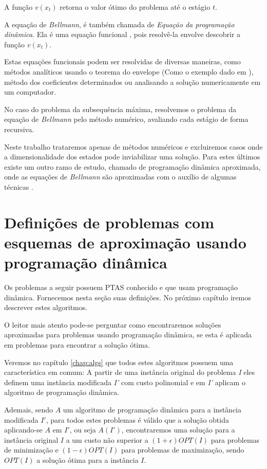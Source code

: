 A função $v(x_t)$ retorna o valor ótimo do problema até o estágio $t$.

A equação de \textit{Bellmann}, é também chamada de \textit{Equação da programação dinâmica}. Ela é uma equação funcional \cite{laibson}, pois resolvê-la envolve descobrir a função $v(x_t)$. 

Estas equações funcionais podem ser resolvidas de diversas maneiras, como métodos analíticos usando o teorema do envelope (Como o exemplo dado em \cite{laibson}), método dos coeficientes determinados ou analisando a solução numericamente em um computador.

No caso do problema da subsequência máxima, resolvemos o problema da equação de \textit{Bellmann} pelo método numérico, avaliando cada estágio de forma recursiva.

Neste trabalho trataremos apenas de métodos numéricos e excluiremos casos onde a dimensionalidade dos estados pode inviabilizar uma solução. Para estes últimos existe um outro ramo de estudo, chamado de programação dinâmica aproximada, onde as equações de \textit{Bellmann} são aproximadas com o auxílio de algumas técnicas \cite{Bertsekas}.

\section{Definições de problemas com esquemas de aproximação usando programação dinâmica}
\label{sec:defsProblemas}

Os problemas a seguir possuem PTAS conhecido e que usam programação dinâmica. Fornecemos nesta seção suas definições. No próximo capítulo iremos descrever estes algoritmos.

O leitor mais atento pode-se perguntar como encontraremos soluções aproximadas para problemas usando programação dinâmica, se esta é aplicada em problemas para encontrar a solução ótima.

Veremos no capítulo \ref{chap:algs} que todos estes algoritmos possuem uma característica em comum: A partir de uma instância original do problema \textit{I} eles definem uma instância modificada \textit{I'} com custo polinomial e em \textit{I'} aplicam o algoritmo de programação dinâmica.

Ademais, sendo $A$ um algoritmo de programação dinâmica para a instância modificada $I'$, para todos estes problemas é válido que a solução obtida aplicando-se $A$ em $I'$, ou seja $A(I')$, encontraremos uma solução para a instância original $I$ a um custo não superior a $(1+\epsilon)OPT(I)$ para problemas de minimização e  $(1-\epsilon)OPT(I)$ para problemas de maximização, sendo $OPT(I)$ a solução ótima para a instância $I$.

